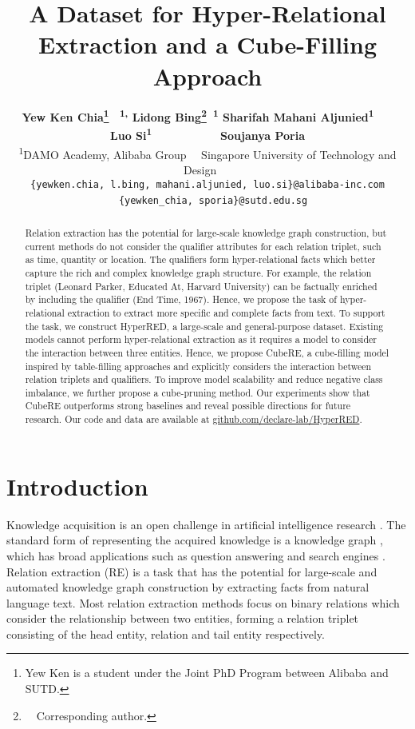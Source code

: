 \documentclass[11pt]{article}
\title{
{A Dataset for Hyper-Relational Extraction and a Cube-Filling Approach}
}
\author{
\textbf{
Yew Ken Chia\thanks{Yew Ken is a student under the Joint PhD Program between Alibaba and SUTD. 
}
~\textsuperscript{\rm 1,}\quad
Lidong Bing\thanks{~~Corresponding author.}~\textsuperscript{\rm 1}\quad
Sharifah Mahani Aljunied\textsuperscript{\rm 1}~~~
}\\
\textbf{
Luo Si\textsuperscript{\rm 1}~~~~~~~~~~
Soujanya Poria\textsuperscript{\rm }\quad} \\
\textsuperscript{\rm 1}DAMO Academy, Alibaba Group~~
\textsuperscript{\rm } Singapore University of Technology and Design ~~\\
{\tt\{yewken.chia, l.bing, mahani.aljunied, luo.si\}@alibaba-inc.com} \\~~{\tt\{yewken\_chia, sporia\}@sutd.edu.sg}}
\newcommand{\modelname}{CubeRE}
\begin{document}
\maketitle
\begin{abstract}

Relation extraction has the potential for large-scale knowledge graph construction, but current methods do not consider the qualifier attributes for each relation triplet, such as time, quantity or location.
The qualifiers form hyper-relational facts which better capture the rich and complex knowledge graph structure.
For example, the relation triplet (Leonard Parker, Educated At, Harvard University) can be factually enriched by including the qualifier (End Time, 1967).
Hence, we propose the task of hyper-relational extraction to extract {more specific and complete facts from text}.
To support the task, we construct HyperRED, a large-scale and general-purpose dataset.
Existing models cannot perform hyper-relational extraction as it requires a model to consider the interaction between three entities.
Hence, we propose \modelname{}, a cube-filling model inspired by table-filling approaches 
and explicitly considers the interaction between relation triplets and qualifiers.
To improve model scalability and reduce negative class imbalance, we further propose a cube-pruning method.
Our experiments show that \modelname{} outperforms strong baselines and reveal possible directions for future research.
Our code and data are available at 
\href{https://github.com/declare-lab/HyperRED}{github.com/declare-lab/HyperRED}.
\end{abstract}

\section{Introduction}

Knowledge acquisition is an open challenge in artificial intelligence research \citep{10.1145/219717.219745}.
The standard form of representing the acquired knowledge is a knowledge graph \citep{HOVY20132}, which has broad applications such as question answering \citep{yih-ma-2016-question, chia-etal-2020-red} and search engines \citep{10.1145/3038912.3052558}.
Relation extraction (RE) is a task that has the potential for large-scale and automated knowledge graph construction by extracting facts from natural language text.
Most relation extraction methods focus on binary relations \citep{bach2007review} which consider the relationship between two entities, forming a relation triplet consisting of the head entity, relation and tail entity respectively.
\end{document}
